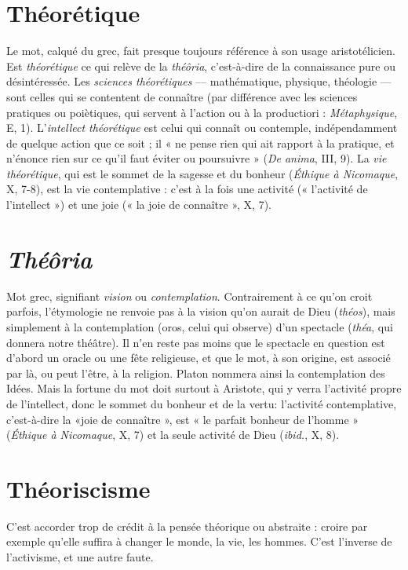 \section{Théorétique}
Le mot, calqué du grec, fait presque toujours référence à
son usage aristotélicien. Est {\it théorétique} ce qui relève de la
{\it théôria}, c’est-à-dire de la connaissance pure ou désintéressée. Les {\it sciences théorétiques}
— mathématique, physique, théologie — sont celles qui se contentent de
connaître (par différence avec les sciences pratiques ou poiètiques, qui servent
à l’action ou à la productiori : {\it Métaphysique}, E, 1). L’{\it intellect théorétique} est
celui qui connaît ou contemple, indépendamment de quelque action que ce
soit ; il « ne pense rien qui ait rapport à la pratique, et n’énonce rien sur ce qu’il
faut éviter ou poursuivre » ({\it De anima}, III, 9). La {\it vie théorétique}, qui est le
sommet de la sagesse et du bonheur ({\it Éthique à Nicomaque}, X, 7-8), est la vie
contemplative : c’est à la fois une activité (« l’activité de l’intellect ») et une joie
(« la joie de connaître », X, 7).

\section{{\it Théôria}}
Mot grec, signifiant {\it vision} ou {\it contemplation}. Contrairement à ce
qu’on croit parfois, l’étymologie ne renvoie pas à la vision qu’on
aurait de Dieu ({\it théos}), mais simplement à la contemplation (oros, celui qui
observe) d’un spectacle ({\it théa}, qui donnera notre théâtre). Il n’en reste pas
moins que le spectacle en question est d’abord un oracle ou une fête religieuse,
et que le mot, à son origine, est associé par là, ou peut l'être, à la religion.
Platon nommera ainsi la contemplation des Idées. Mais la fortune du mot doit
surtout à Aristote, qui y verra l’activité propre de l’intellect, donc le sommet du
bonheur et de la vertu: l’activité contemplative, c’est-à-dire la «joie de
connaître », est « le parfait bonheur de l’homme » ({\it Éthique à Nicomaque}, X, 7)
et la seule activité de Dieu ({\it ibid.}, X, 8).

\section{Théoriscisme}
C'est accorder trop de crédit à la pensée théorique ou
abstraite : croire par exemple qu’elle suffira à changer le
monde, la vie, les hommes. C’est l’inverse de l’activisme, et une autre faute.

